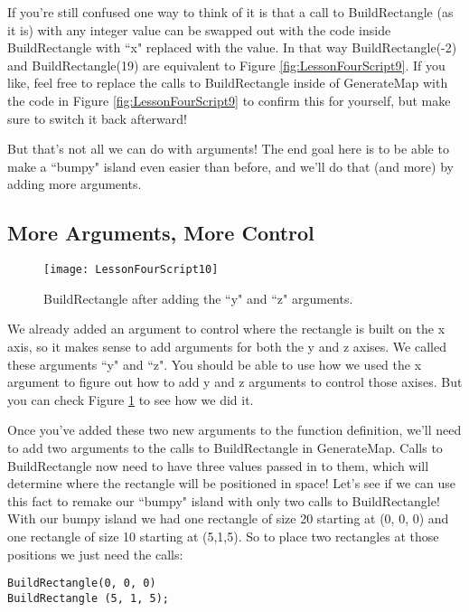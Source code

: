 \documentclass{article}
\begin{document}
If you're still confused one way to think of it is that a call to BuildRectangle (as it is) with any integer value can be swapped out with the code inside BuildRectangle with ``x" replaced with the value. In that way BuildRectangle(-2) and BuildRectangle(19) are equivalent to Figure \ref{fig:LessonFourScript9}. If you like, feel free to replace the calls to BuildRectangle inside of GenerateMap with the code in Figure \ref{fig:LessonFourScript9} to confirm this for yourself, but make sure to switch it back afterward!

But that's not all we can do with arguments! The end goal here is to be able to make a ``bumpy" island even easier than before, and we'll do that (and more) by adding more arguments. 

\subsection{More Arguments, More Control}

\begin{figure}
  \texttt{[image: LessonFourScript10]}
  \caption{BuildRectangle after adding the ``y" and ``z" arguments.}
  \label{fig:LessonFourScript10}
\end{figure}

We already added an argument to control where the rectangle is built on the x axis, so it makes sense to add arguments for both the y and z axises. We called these arguments ``y" and ``z". You should be able to use how we used the x argument to figure out how to add y and z arguments to control those axises. But you can check Figure \ref{fig:LessonFourScript10} to see how we did it. 

Once you've added these two new arguments to the function definition, we'll need to add two arguments to the calls to BuildRectangle in GenerateMap. Calls to BuildRectangle now need to have three values passed in to them, which will determine where the rectangle will be positioned in space! Let's see if we can use this fact to remake our ``bumpy" island with only two calls to BuildRectangle! With our bumpy island we had one rectangle of size 20 starting at (0, 0, 0) and one rectangle of size 10 starting at (5,1,5). So to place two rectangles at those positions we just need the calls:

\lstset{style=sharpc}
\begin{lstlisting}
BuildRectangle(0, 0, 0)
BuildRectangle (5, 1, 5);
\end{lstlisting} 
\end{document}
